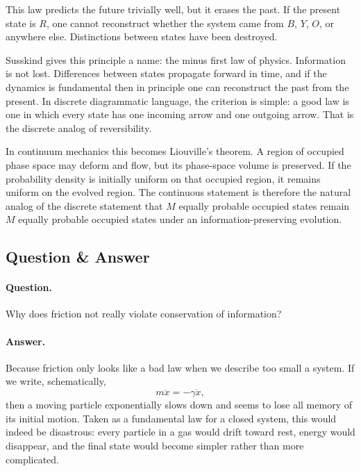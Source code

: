 This law predicts the future trivially well, but it erases the past. If the present state is \(R\), one cannot reconstruct whether the system came from \(B\), \(Y\), \(O\), or anywhere else. Distinctions between states have been destroyed.

Susskind gives this principle a name: the minus first law of physics. Information is not lost. Differences between states propagate forward in time, and if the dynamics is fundamental then in principle one can reconstruct the past from the present. In discrete diagrammatic language, the criterion is simple: a good law is one in which every state has one incoming arrow and one outgoing arrow. That is the discrete analog of reversibility.

In continuum mechanics this becomes Liouville's theorem. A region of occupied phase space may deform and flow, but its phase-space volume is preserved. If the probability density is initially uniform on that occupied region, it remains uniform on the evolved region. The continuous statement is therefore the natural analog of the discrete statement that \(M\) equally probable occupied states remain \(M\) equally probable occupied states under an information-preserving evolution.

\subsection{Question \& Answer}

\paragraph{Question.} Why does friction not really violate conservation of information?

\paragraph{Answer.} Because friction only looks like a bad law when we describe too small a system. If we write, schematically,
\begin{equation}
m\ddot x = -\gamma \dot x,
\end{equation}
then a moving particle exponentially slows down and seems to lose all memory of its initial motion. Taken as a fundamental law for a closed system, this would indeed be disastrous: every particle in a gas would drift toward rest, energy would disappear, and the final state would become simpler rather than more complicated.

